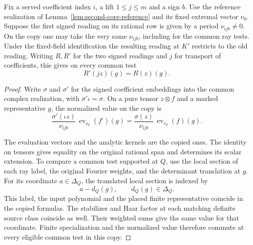 \begin{auxlemma}
\label{lem:copied-reference-period}
Fix a served coefficient index \(i\), a lift \(1\le j\le m\)
and a sign \(b\). Use the reference realization of
Lemma~\ref{lem:second-core-reference} and its fixed extremal
vector \(v_0\). Suppose the first signed reading on its rational
row is given by a period \(\nu_{ijb}\ne0\). On the copy one may
take the very same \(\nu_{ijb}\), including for the common ray
tests. Under the fixed-field identification the resulting
reading at \(K'\) restricts to the old reading.
Writing \(R,R'\) for the two signed readings and \(j\) for transport of coefficients, this gives on every common test
\[
                         R'(jz)(g)=R(z)(g).
\]
\end{auxlemma}
\begin{proof}
Write \(\sigma\) and \(\sigma'\) for the signed coefficient
embeddings into the common complex realization, with
\(\sigma'\iota=\sigma\). On a pure tensor \(z\otimes f\) and a
marked representative \(g\), the normalized value on the copy is
\[
   \frac{\sigma'(\iota z)}{\nu_{ijb}}\,
            \operatorname{ev}_{v_0}(f^\iota)(g)
       = \frac{\sigma(z)}{\nu_{ijb}}\,
            \operatorname{ev}_{v_0}(f)(g).
\]

The evaluation vectors and the analytic kernels are the copied
ones. The identity on tensors gives equality on the original
rational span and determines its scalar extension. To compare a
common test supported at \(Q\), use the local section of each
ray label, the original Fourier weights, and the determinant
translation at \(g\). For its coordinate \(a\in\Delta_Q\), the
translated local section is indexed by
\[
                      a-d_Q(g),\qquad d_Q(g)\in\Delta_Q .
\]
This label, the input polynomial and the placed finite
representative coincide in the copied formulas. The stabilizer
and Haar factor at each matching definite source class coincide
as well. Their weighted sums give the same value for that
coordinate. Finite specialization and the normalized value
therefore commute at every eligible common test in this copy.
\end{proof}

